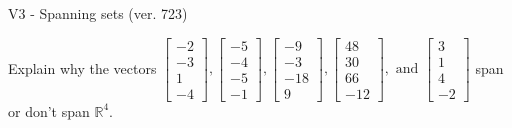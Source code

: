 \begin{exercise}
  \begin{exerciseTitle}V3 - Spanning sets (ver. 723)\end{exerciseTitle}
  \begin{exerciseStatement}
    Explain why the vectors \(\left[\begin{array}{r}
-2 \\
-3 \\
1 \\
-4
\end{array}\right] , \left[\begin{array}{r}
-5 \\
-4 \\
-5 \\
-1
\end{array}\right] , \left[\begin{array}{r}
-9 \\
-3 \\
-18 \\
9
\end{array}\right] , \left[\begin{array}{r}
48 \\
30 \\
66 \\
-12
\end{array}\right] , \text{ and } \left[\begin{array}{r}
3 \\
1 \\
4 \\
-2
\end{array}\right]\) span or don't span \(\mathbb{R}^4\). 
	



\end{exerciseStatement}
\end{exercise}
